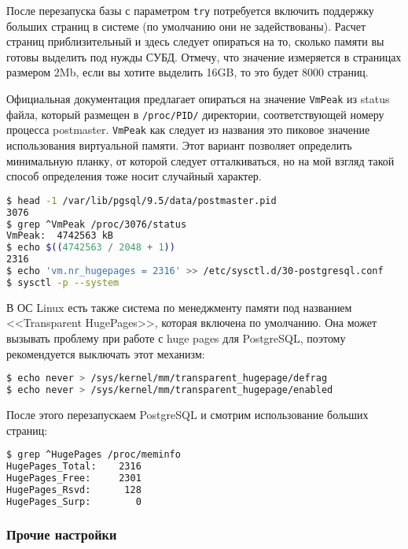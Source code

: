 После перезапуска базы с параметром \lstinline!try! потребуется включить поддержку больших страниц в системе (по умолчанию они не задействованы). Расчет страниц приблизительный и здесь следует опираться на то, сколько памяти вы готовы выделить под нужды СУБД. Отмечу, что значение измеряется в страницах размером 2Mb, если вы хотите выделить 16GB, то это будет 8000 страниц.

Официальная документация предлагает опираться на значение \lstinline!VmPeak! из status файла, который размещен в \lstinline!/proc/PID/! директории, соответствующей номеру процесса postmaster. \lstinline!VmPeak! как следует из названия это пиковое значение использования виртуальной памяти. Этот вариант позволяет определить минимальную планку, от которой следует отталкиваться, но на мой взгляд такой способ определения тоже носит случайный характер.

\begin{lstlisting}[language=Bash,label=lst:settings_hugepages2,caption=Включаем поддержку huge pages в системе]
$ head -1 /var/lib/pgsql/9.5/data/postmaster.pid
3076
$ grep ^VmPeak /proc/3076/status
VmPeak:  4742563 kB
$ echo $((4742563 / 2048 + 1))
2316
$ echo 'vm.nr_hugepages = 2316' >> /etc/sysctl.d/30-postgresql.conf
$ sysctl -p --system
\end{lstlisting}

В ОС Linux есть также система по менеджменту памяти под названием <<Transparent HugePages>>, которая включена по умолчанию. Она может вызывать проблему при работе с huge pages для PostgreSQL, поэтому рекомендуется выключать этот механизм:

\begin{lstlisting}[language=Bash,label=lst:settings_hugepages3,caption=Отключаем Transparent HugePages]
$ echo never > /sys/kernel/mm/transparent_hugepage/defrag
$ echo never > /sys/kernel/mm/transparent_hugepage/enabled
\end{lstlisting}

После этого перезапускаем PostgreSQL и смотрим использование больших страниц:

\begin{lstlisting}[language=Bash,label=lst:settings_hugepages4,caption=Проверяем использование huge pages]
$ grep ^HugePages /proc/meminfo
HugePages_Total:    2316
HugePages_Free:     2301
HugePages_Rsvd:      128
HugePages_Surp:        0
\end{lstlisting}


\subsubsection{Прочие настройки}

